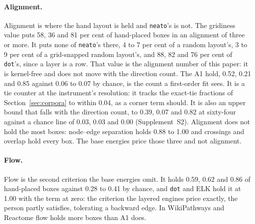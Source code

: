 \documentclass[11pt]{article}
\begin{document}
\paragraph{Alignment.} Alignment is where the hand layout is held and \texttt{neato}'s
is not. The gridiness value puts 58, 36 and 81 per cent of hand-placed boxes in an
alignment of three or more. It puts none of \texttt{neato}'s there, 4 to 7 per cent of a
random layout's, 3 to 9 per cent of a grid-snapped random layout's, and 88, 82 and 76 per
cent of \texttt{dot}'s, since a layer is a row. That value is the alignment number of this paper:
it is kernel-free and does not move with the direction count. The A1 hold, 0.52, 0.21 and
0.85 against 0.06 to 0.07 by chance, is the count a first-order fit sees. It is a tie
counter at the instrument's resolution: it tracks the exact-tie fractions of
Section~\ref{sec:corpora} to within 0.04, as a corner term should. It is also an upper
bound that falls with the direction count, to 0.39, 0.07 and 0.82 at sixty-four against a
chance line of 0.03, 0.03 and 0.00 (Supplement~S2). Alignment does not hold the most
boxes: node--edge separation holds 0.88 to 1.00 and crossings and overlap hold every
box. The base energies price those three and not alignment.

\paragraph{Flow.} Flow is the second criterion the base energies omit. It holds 0.59,
0.62 and 0.86 of hand-placed boxes against 0.28 to 0.41 by chance, and \texttt{dot} and
ELK hold it at 1.00 with the term at zero: the criterion the layered engines price
exactly, the person partly satisfies, tolerating a backward edge. In WikiPathways and
Reactome flow holds more boxes than A1 does.
\end{document}
